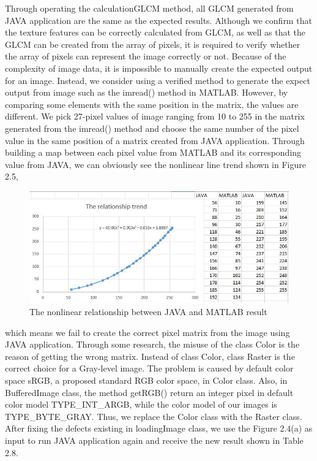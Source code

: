 Through operating the calculationGLCM method, all GLCM generated from JAVA application are the same as the expected results. 
Although we confirm that the texture features can be correctly calculated from GLCM, as well as that the GLCM can be created from the array of pixels, it is required to verify whether the array of pixels can represent the image correctly or not. Because of the complexity of image data, it is impossible to manually create the expected output for an image. Instead, we consider using a verified method to generate the expect output from image such as the imread() method in MATLAB. However, by comparing some elements with the same position in the matrix, the values are different. We pick 27-pixel values of image ranging from 10 to 255 in the matrix generated from the imread() method and choose the same number of the pixel value in the same position of a matrix created from JAVA application. Through building a map between each pixel value from MATLAB and its corresponding value from JAVA, we can obviously see the nonlinear line trend shown in Figure 2.5, 
\begin{figure}[!h]
\includegraphics[width = \linewidth]{rgb_statistical}
\caption{The nonlinear relationship between JAVA and MATLAB result}
\end{figure}
which means we fail to create the correct pixel matrix from the image using JAVA application. Through some research, the misuse of the class Color is the reason of getting the wrong matrix. Instead of class Color, class Raster is the correct choice for a Gray-level image. The problem is caused by default color space sRGB, a proposed standard RGB color space, in Color class. Also, in BufferedImage class, the method getRGB() return an integer pixel in default color model TYPE\_INT\_ARGB, while the color model of our images is TYPE\_BYTE\_GRAY. Thus, we replace the Color class with the Raster class. After fixing the defects existing in loadingImage class, we use the Figure 2.4(a) as input to run JAVA application again and receive the new result shown in Table 2.8. 
